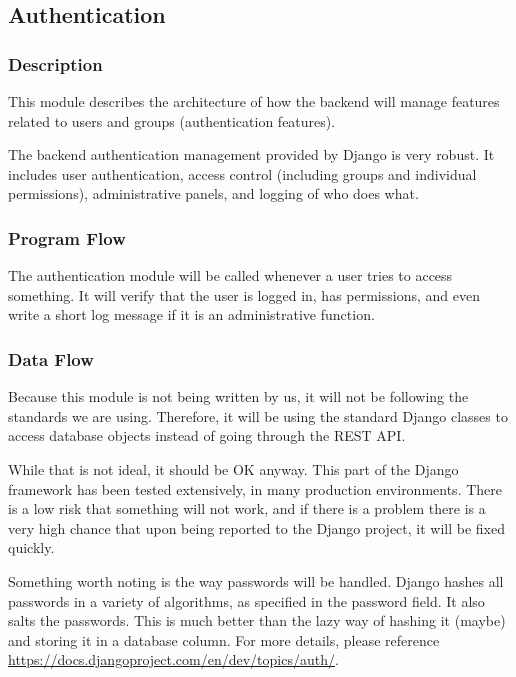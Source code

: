 
\subsection{Authentication}

\subsubsection{Description}

This module describes the architecture of how the backend will manage features related to users and groups (authentication features).

The backend authentication management provided by Django is very robust.
It includes user authentication, access control (including groups and individual permissions), administrative panels, and logging of who does what.


\subsubsection{Program Flow}

The authentication module will be called whenever a user tries to access something.
It will verify that the user is logged in, has permissions, and even write a short log message if it is an administrative function.

\subsubsection{Data Flow}

Because this module is not being written by us, it will not be following the standards we are using.
Therefore, it will be using the standard Django classes to access database objects instead of going through the REST API.


While that is not ideal, it should be OK anyway.
This part of the Django framework has been tested extensively, in many production environments.
There is a low risk that something will not work, and if there is a problem there is a very high chance that upon being reported to the Django project, it will be fixed quickly.

Something worth noting is the way passwords will be handled.
Django hashes all passwords in a variety of algorithms, as specified in the password field.
It also salts the passwords.
This is much better than the lazy way of hashing it (maybe) and storing it in a database column.
For more details, please reference \url{https://docs.djangoproject.com/en/dev/topics/auth/}.

